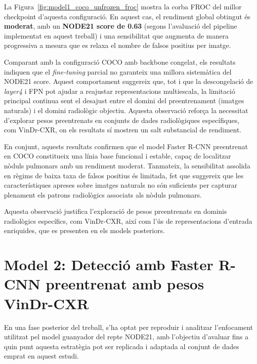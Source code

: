 \documentclass[conference]{IEEEtran}
\begin{document}
La Figura~\ref{fig:model1_coco_unfrozen_froc} mostra la corba FROC del millor checkpoint
d’aquesta configuració. En aquest cas, el rendiment global obtingut és
\textbf{moderat}, amb un \textbf{NODE21 score de 0.63} (segons l’avaluació del pipeline
implementat en aquest treball) i una sensibilitat que augmenta de manera
progressiva a mesura que es relaxa el nombre de falsos positius per imatge.


Comparant amb la configuració COCO amb backbone congelat, els resultats indiquen que el
\textit{fine-tuning} parcial no garanteix una millora sistemàtica del NODE21 score. Aquest
comportament suggereix que, tot i que la descongelació de \textit{layer4} i FPN pot ajudar
a reajustar representacions multiescala, la limitació principal continua sent el desajust
entre el domini del preentrenament (imatges naturals) i el domini radiològic objectiu.
Aquesta observació reforça la necessitat d’explorar pesos preentrenats en conjunts de dades
radiològiques específiques, com VinDr-CXR, on els resultats sí mostren un salt substancial
de rendiment.


En conjunt, aquests resultats confirmen que el model Faster R-CNN preentrenat en
COCO constitueix una línia base funcional i estable, capaç de localitzar nòduls
pulmonars amb un rendiment moderat. Tanmateix, la sensibilitat assolida en règims
de baixa taxa de falsos positius és limitada, fet que suggereix que les
característiques apreses sobre imatges naturals no són suficients per capturar
plenament els patrons radiològics associats als nòduls pulmonars.

Aquesta observació justifica l’exploració de pesos preentrenats en dominis
radiològics específics, com VinDr-CXR, així com l’ús de representacions d’entrada
enriquides, que es presenten en els models posteriors.







\section{Model 2: Detecció amb Faster R-CNN preentrenat amb pesos VinDr-CXR}

En una fase posterior del treball, s’ha optat per reproduir i analitzar l’enfocament
utilitzat pel model guanyador del repte NODE21, amb l’objectiu d’avaluar fins a quin punt
aquesta estratègia pot ser replicada i adaptada al conjunt de dades emprat en aquest estudi.
\end{document}
